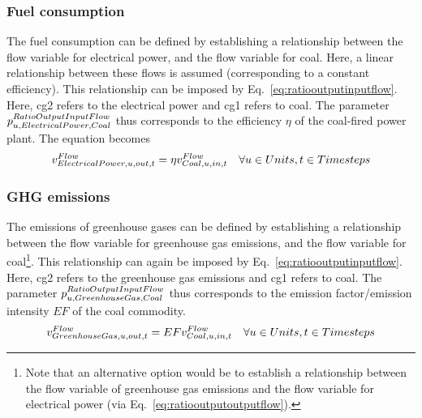 \documentclass[10pt,english]{article}
\begin{document}
\subsubsection{Fuel consumption}
The fuel consumption can be defined by establishing a relationship between the flow variable for electrical power, and the flow variable for coal. Here, a linear relationship between these flows is assumed (corresponding to a constant efficiency). This relationship can be imposed by Eq.~\eqref{eq:ratiooutputinputflow}. Here, cg2 refers to the electrical power and cg1 refers to coal. The parameter $\pRatioOutputInputFlow[u,ElectricalPower,Coal]$ thus corresponds to the efficiency $\eta$ of the coal-fired power plant. The equation becomes
\begin{align}
\vFlow[ElectricalPower,u,out,t] = \eta \vFlow[Coal,u,in,t] \quad \forall \units, \timesteps
\end{align}

\subsubsection{GHG emissions}
The emissions of greenhouse gases can be defined by establishing a relationship between the flow variable for greenhouse gas emissions, and the flow variable for coal\footnote{Note that an alternative option would be to establish a relationship between the flow variable of greenhouse gas emissions and the flow variable for electrical power (via Eq.~\eqref{eq:ratiooutputoutputflow}).}. This relationship can again be imposed by Eq.~\eqref{eq:ratiooutputinputflow}. Here, cg2 refers to the greenhouse gas emissions and cg1 refers to coal. The parameter $\pRatioOutputInputFlow[u,GreenhouseGas,Coal]$ thus corresponds to the emission factor/emission intensity $EF$ of the coal commodity. 
\begin{align}
\vFlow[GreenhouseGas,u,out,t] =  EF \vFlow[Coal,u,in,t] \quad \forall \units, \timesteps
\end{align}
\end{document}
